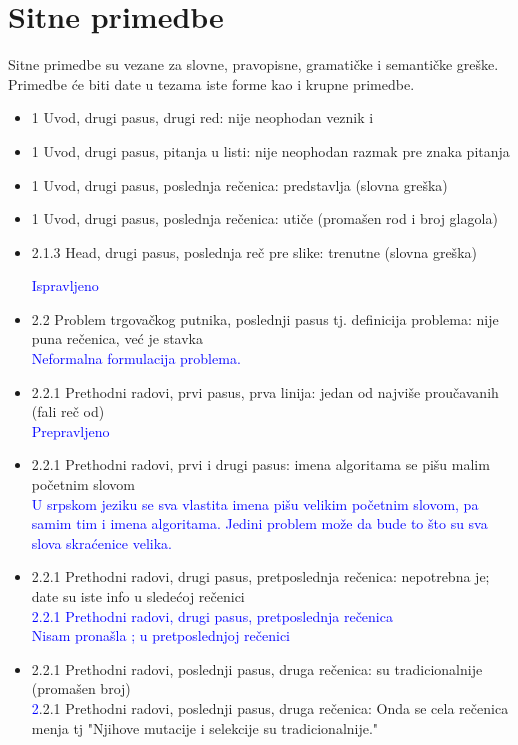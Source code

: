 \documentclass[a4paper]{report}
\newcommand{\odgovor}[1]{\textcolor{blue}{#1}}
\begin{document}
\section{Sitne primedbe}
Sitne primedbe su vezane za slovne, pravopisne, gramatičke i semantičke greške. Primedbe će biti date u tezama iste forme kao i krupne primedbe.
\begin{itemize}
    \item 1 Uvod, drugi pasus, drugi red: nije neophodan veznik i
    \item 1 Uvod, drugi pasus, pitanja u listi: nije neophodan razmak pre znaka pitanja
    \item 1 Uvod, drugi pasus, poslednja rečenica: predstavlja (slovna greška)
    \item 1 Uvod, drugi pasus, poslednja rečenica: utiče (promašen rod i broj glagola)
    \item 2.1.3 Head, drugi pasus, poslednja reč pre slike: trenutne (slovna greška)
    
    \odgovor{Ispravljeno}
    
    \item 2.2 Problem trgovačkog putnika, poslednji pasus tj. definicija problema: nije puna rečenica, već je stavka \\
    \odgovor {Neformalna formulacija problema.}
    
    \item 2.2.1 Prethodni radovi, prvi pasus, prva linija: jedan od najviše proučavanih (fali reč od)\\
    \odgovor{ Prepravljeno}
    
    \item 2.2.1 Prethodni radovi, prvi i drugi pasus: imena algoritama se pišu malim početnim slovom\\
    \odgovor{ U srpskom jeziku se sva vlastita imena pišu velikim početnim slovom, pa samim tim i imena algoritama. Jedini problem može da bude to što su sva slova skraćenice velika.}
    
    \item 2.2.1 Prethodni radovi, drugi pasus, pretposlednja rečenica: nepotrebna je; date su iste info u sledećoj rečenici\\
    \odgovor{ 2.2.1 Prethodni radovi, drugi pasus, pretposlednja rečenica \\ Nisam pronašla ; u pretposlednjoj rečenici \\}
    
    \item 2.2.1 Prethodni radovi, poslednji pasus, druga rečenica: su tradicionalnije (promašen broj)\\
      \odgovor2.2.1 Prethodni radovi, poslednji pasus, druga rečenica:
      Onda se cela rečenica menja tj "Njihove mutacije i selekcije su tradicionalnije."
    

\end{itemize}
\end{document}

